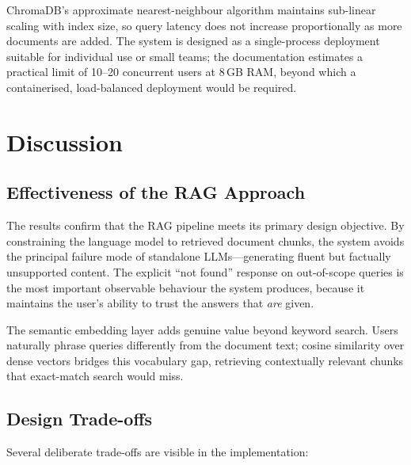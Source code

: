 ChromaDB's approximate nearest-neighbour algorithm maintains
sub-linear scaling with index size, so query latency does not increase
proportionally as more documents are added. The system is designed as a
single-process deployment suitable for individual use or small teams;
the documentation estimates a practical limit of 10--20 concurrent users
at 8\,GB RAM, beyond which a containerised, load-balanced deployment
would be required.

\section{Discussion}

\subsection{Effectiveness of the RAG Approach}

The results confirm that the RAG pipeline meets its primary design objective.
By constraining the language model to retrieved document chunks, the system
avoids the principal failure mode of standalone LLMs---generating fluent but
factually unsupported content. The explicit ``not found'' response on
out-of-scope queries is the most important observable behaviour the system
produces, because it maintains the user's ability to trust the answers
that \emph{are} given.

The semantic embedding layer adds genuine value beyond keyword search.
Users naturally phrase queries differently from the document text; cosine
similarity over dense vectors bridges this vocabulary gap, retrieving
contextually relevant chunks that exact-match search would miss.

\subsection{Design Trade-offs}

Several deliberate trade-offs are visible in the implementation:


